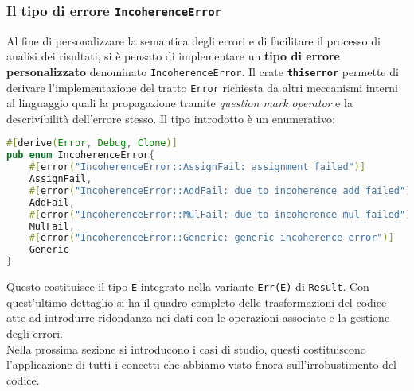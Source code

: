 \subsubsection{Il tipo di errore \texttt{IncoherenceError}}
Al fine di personalizzare la semantica degli errori e di facilitare il processo di analisi dei risultati, si è pensato di implementare un \textbf{tipo di errore personalizzato} denominato \texttt{IncoherenceError}. Il crate \textbf{\texttt{thiserror}} permette di derivare l'implementazione del tratto \texttt{Error} richiesta da altri meccanismi interni al linguaggio quali la propagazione tramite \textit{question mark operator} e la descrivibilità dell'errore stesso. Il tipo introdotto è un enumerativo: 

\begin{lstlisting}[language=Rust, style=boxed]
#[derive(Error, Debug, Clone)]
pub enum IncoherenceError{
    #[error("IncoherenceError::AssignFail: assignment failed")]
    AssignFail,
    #[error("IncoherenceError::AddFail: due to incoherence add failed")]
    AddFail,
    #[error("IncoherenceError::MulFail: due to incoherence mul failed")]
    MulFail,
    #[error("IncoherenceError::Generic: generic incoherence error")]
    Generic
}
\end{lstlisting}
Questo costituisce il tipo \texttt{E} integrato nella variante \texttt{Err(E)} di \texttt{Result}. Con quest'ultimo dettaglio si ha il quadro completo delle trasformazioni del codice atte ad introdurre ridondanza nei dati con le operazioni associate e la gestione degli errori. \\
Nella prossima sezione si introducono i casi di studio, questi costituiscono l'applicazione di tutti i concetti che abbiamo visto finora sull'irrobustimento del codice.

